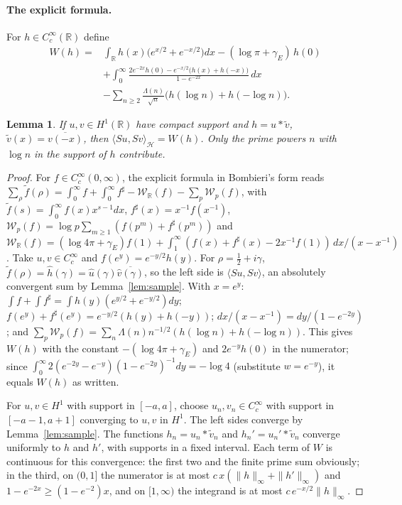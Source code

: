 \documentclass[11pt,a4paper]{article}
\theoremstyle{plain}
\newtheorem{lemma}[theorem]{Lemma}
\theoremstyle{remark}
\newcommand{\R}{\mathbb R}
\newcommand{\Hs}{\mathcal H}
\begin{document}
\paragraph{The explicit formula.}
For $h\in C_c^\infty(\R)$ define
\begin{align*}
 W(h)={}&\int_\R h(x)\bigl(e^{x/2}+e^{-x/2}\bigr)dx-(\log\pi+\gamma_E)\,h(0)\\
 &+\int_0^\infty\frac{2e^{-2x}h(0)-e^{-x/2}\bigl(h(x)+h(-x)\bigr)}{1-e^{-2x}}\,dx\\
 &-\sum_{n\ge2}\frac{\Lambda(n)}{\sqrt n}\bigl(h(\log n)+h(-\log n)\bigr).
\end{align*}

\begin{lemma}\label{lem:EF}
If $u,v\in H^1(\R)$ have compact support and $h=u*\widetilde v$, $\widetilde v(x)=\overline{v(-x)}$, then
$\langle Su,Sv\rangle_\Hs=W(h)$. Only the prime powers $n$ with $\log n$ in the support of $h$ contribute.
\end{lemma}
\begin{proof}
For $f\in C_c^\infty(0,\infty)$, the explicit formula in Bombieri's form \cite[Appendix ``Explicit formula'', its first three displayed formulas]{cc-weil} reads
$\sum_\rho\widetilde f(\rho)=\int_0^\infty f+\int_0^\infty f^\sharp-\mathcal W_\R(f)-\sum_p\mathcal W_p(f)$, with
$\widetilde f(s)=\int_0^\infty f(x)x^{s-1}dx$, $f^\sharp(x)=x^{-1}f(x^{-1})$,
$\mathcal W_p(f)=\log p\sum_{m\ge1}(f(p^m)+f^\sharp(p^m))$ and
$\mathcal W_\R(f)=(\log4\pi+\gamma_E)f(1)+\int_1^\infty(f(x)+f^\sharp(x)-2x^{-1}f(1))\,dx/(x-x^{-1})$. Take $u,v\in
C_c^\infty$ and $f(e^y)=e^{-y/2}h(y)$. For $\rho=\frac12+i\gamma$, $\widetilde f(\rho)=\widehat h(\gamma)=\widehat
u(\gamma)\overline{\widehat v(\gamma)}$, so the left side is $\langle Su,Sv\rangle$, an absolutely convergent sum by
Lemma~\ref{lem:sample}. With $x=e^y$: $\int f+\int f^\sharp=\int h(y)(e^{y/2}+e^{-y/2})dy$; $f(e^y)+f^\sharp(e^y)=
e^{-y/2}(h(y)+h(-y))$; $dx/(x-x^{-1})=dy/(1-e^{-2y})$; and $\sum_p\mathcal W_p(f)=\sum_n\Lambda(n)n^{-1/2}(h(\log
n)+h(-\log n))$. This gives $W(h)$ with the constant $-(\log4\pi+\gamma_E)$ and $2e^{-y}h(0)$ in the numerator; since
$\int_0^\infty2(e^{-2y}-e^{-y})(1-e^{-2y})^{-1}dy=-\log4$ (substitute $w=e^{-y}$), it equals $W(h)$ as written.

For $u,v\in H^1$ with support in $[-a,a]$, choose $u_n,v_n\in C_c^\infty$ with support in $[-a-1,a+1]$ converging to
$u,v$ in $H^1$. The left sides converge by Lemma~\ref{lem:sample}. The functions $h_n=u_n*\widetilde v_n$ and
$h_n'=u_n'*\widetilde v_n$ converge uniformly to $h$ and $h'$, with supports in a fixed interval. Each term of $W$ is
continuous for this convergence: the first two and the finite prime sum obviously; in the third, on $(0,1]$ the
numerator is at most $c\,x(\|h\|_\infty+\|h'\|_\infty)$ and $1-e^{-2x}\ge(1-e^{-2})x$, and on $[1,\infty)$ the
integrand is at most $c\,e^{-x/2}\|h\|_\infty$.
\end{proof}
\end{document}
